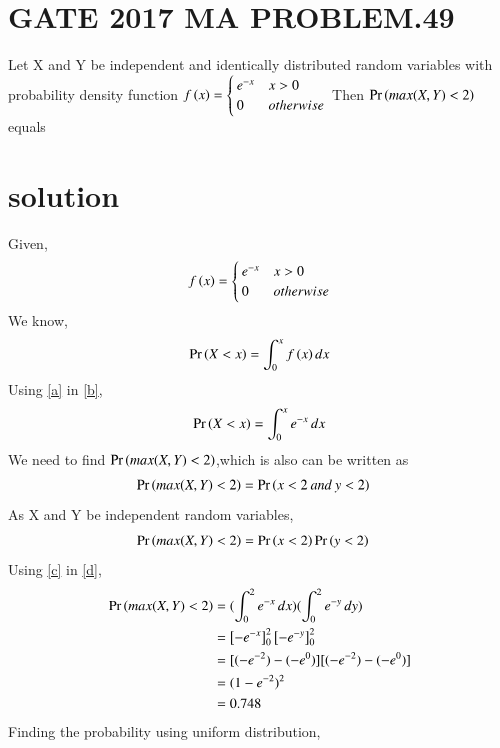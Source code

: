\documentclass[journal,12pt,twocolumn]{IEEEtran}
\begin{document}
\section{GATE 2017 MA PROBLEM.49}
Let X and Y be independent and identically distributed random variables with probability density function
$f\left(x\right)= \begin{cases}
       e^{-x}  & x>0\\
        0 & otherwise\\
    \end{cases}$
  Then $\Pr\left(max(X,Y)<2\right)$ equals  
  \section{solution}
Given,
\begin{align}
f\left(x\right) = 
    \begin{cases}
       e^{-x}  & x>0\\
        0 & otherwise\\
   \end{cases} \label{a}
\end{align}
We know,
\begin{align}
\Pr\left(X<x\right) = \int_{0}^{x}{f\left(x\right)}\,dx \label{b}
\end{align}
Using \eqref{a} in \eqref{b},
\begin{align}
\Pr\left(X<x\right) = \int_{0}^{x}{e^{-x}}\,dx \label{c}
\end{align}
We need to find $\Pr\left( max(X,Y)<2\right)$,which is also can be written as
\begin{align}
   \Pr\left(max(X,Y)<2\right) &=\Pr\left(x<2\: and \:y<2\right)
\end{align}
As X and Y be independent random variables,
\begin{align}
   \Pr\left(max(X,Y)<2\right) &=\Pr\left(x<2\right)\Pr\left(y<2\right) \label{d}
\end{align}
Using \eqref{c} in \eqref{d},
\begin{align}
   \Pr\left(max(X,Y)<2\right) &= (\int_{0}^{2}{e^{-x}}\,dx) (\int_{0}^{2}{e^{-y}}\,dy)\\
   &= \left[-e^{-x}\right]_0^2 \left[-e^{-y}\right]_0^2\\
   &= [(-e^{-2}) - (-e^{0})][(-e^{-2}) - (-e^{0})]\\
   &= (1 -e^{-2})^{2}\\
   &=0.748
\end{align}
Finding the probability using uniform distribution,
\end{document}
